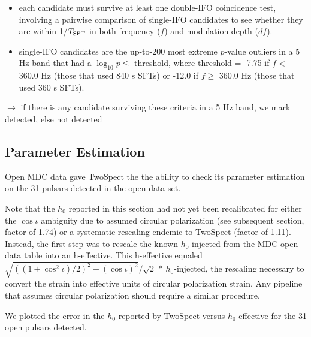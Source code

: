 \begin{itemize}
\item each candidate must survive at least one double-IFO coincidence test, involving a pairwise comparison of single-IFO candidates to see whether they are within 1/$T_{\textup{SFT}}$ in both frequency ($f$) and modulation depth ($df$).
\item single-IFO candidates are the up-to-200 most extreme $p$-value outliers in a 5 Hz band that had a $\log_{10}p \leq$ threshold, where threshold = -7.75 if $f <$ 360.0 Hz (those that used 840 s SFTs) or -12.0 if $f \geq$ 360.0 Hz (those that used 360 s SFTs).
\end{itemize}

$\rightarrow$ if there is any candidate surviving these criteria in a 5 Hz band, we mark detected, else not detected

\subsection{Parameter Estimation}

Open MDC data gave TwoSpect the the ability to check its parameter estimation on the 31 pulsars detected in the open data set.

Note that the $h_0$ reported in this section had not yet been recalibrated for either the $\cos \iota$ ambiguity due to assumed circular polarization (see subsequent section, factor of 1.74) or a systematic rescaling endemic to TwoSpect (factor of 1.11). Instead, the first step was to rescale the known $h_0$-injected from the MDC open data table into an h-effective. This h-effective equaled $\sqrt{ ((1+\cos^2 \iota) / 2)^2 + (\cos \iota)^2 }/\sqrt{2}$ * $h_0$-injected, the rescaling necessary to convert the strain into effective units of circular polarization strain. Any pipeline that assumes circular polarization should require a similar procedure.

We plotted the error in the $h_0$ reported by TwoSpect versus $h_0$-effective for the 31 open pulsars detected.


